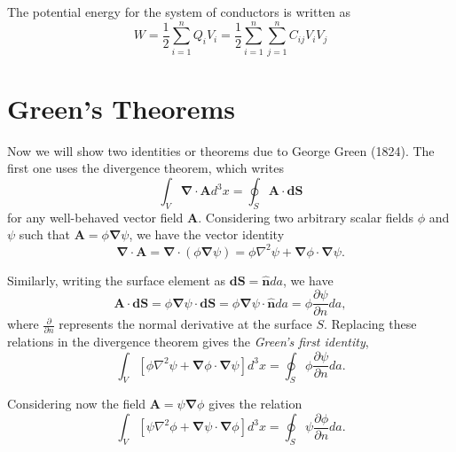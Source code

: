 The potential energy for the system of conductors is written as 
\begin{equation}
W =  \frac{1}{2} \sum_{i=1} ^n Q_i V_i = \frac{1}{2}  \sum_{i=1} ^n \sum_{j=1} ^n C_{ij}  V_i V_j 
\end{equation}


\section{Green's Theorems}
Now we will show two identities or theorems due to George Green (1824). The first one uses the divergence theorem, which writes
\begin{equation}
\int_V \boldsymbol{\nabla} \cdot \textbf{A} d^3x = \oint_S \textbf{A} \cdot \textbf{dS} 
\end{equation}
for any well-behaved vector field $\textbf{A}$. Considering two arbitrary scalar fields $\phi$ and $\psi$ such that $\textbf{A}=\phi \boldsymbol{\nabla} \psi$, we have the vector identity
\begin{equation}
\boldsymbol{\nabla} \cdot \textbf{A} = \boldsymbol{\nabla} \cdot (\phi \boldsymbol{\nabla} \psi) = \phi \nabla^2 \psi +\boldsymbol{\nabla} \phi \cdot \boldsymbol{\nabla} \psi . 
\end{equation}

Similarly, writing the surface element as $\textbf{dS} = \hat{\textbf{n}} da$, we have
\begin{equation}
\textbf{A} \cdot \textbf{dS} = \phi \boldsymbol{\nabla} \psi \cdot \textbf{dS} =  \phi \boldsymbol{\nabla} \psi \cdot \hat{\textbf{n}} da = \phi \frac{\partial \psi}{\partial n} da ,
\end{equation}
where $\frac{\partial }{\partial n}$ represents the normal derivative at the surface $S$. Replacing these relations in the divergence theorem gives the \textit{Green's first identity},
\begin{equation}
\int_V \left[ \phi \nabla^2 \psi +\boldsymbol{\nabla} \phi \cdot \boldsymbol{\nabla} \psi \right] d^3x = \oint_S \phi \frac{\partial \psi}{\partial n} da.  \label{eq:GreenFirstIdentity}
\end{equation}

Considering now the field $\textbf{A}=\psi \boldsymbol{\nabla} \phi$ gives the relation
\begin{equation}
\int_V \left[ \psi \nabla^2 \phi +\boldsymbol{\nabla} \psi \cdot \boldsymbol{\nabla} \phi \right] d^3x = \oint_S \psi \frac{\partial \phi}{\partial n} da. 
\end{equation}

